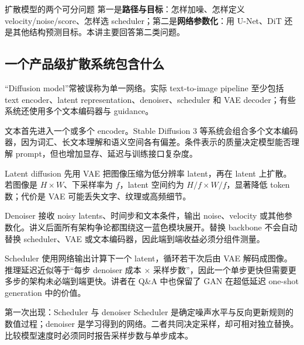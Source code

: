 \begin{importantbox}{扩散模型的两个可分问题}
第一是\textbf{路径与目标}：怎样加噪、怎样定义 velocity/noise/score、怎样选 scheduler；第二是\textbf{网络参数化}：用 U-Net、DiT 还是其他结构预测目标。本讲主要回答第二类问题。
\end{importantbox}

\subsection{一个产品级扩散系统包含什么}

“Diffusion model”常被误称为单一网络。实际 text-to-image pipeline 至少包括 text encoder、latent representation、denoiser、scheduler 和 VAE decoder；有些系统还使用多个文本编码器与 guidance。


文本首先进入一个或多个 encoder。Stable Diffusion 3 等系统会组合多个文本编码器，因为词汇、长文本理解和语义空间各有偏差。条件表示的质量决定模型能否理解 prompt，但也增加显存、延迟与训练接口复杂度。


Latent diffusion 先用 VAE 把图像压缩为低分辨率 latent，再在 latent 上扩散。若图像是 $H\times W$、下采样率为 $f$，latent 空间约为 $H/f\times W/f$，显著降低 token 数；代价是 VAE 可能丢失文字、纹理或高频细节。


Denoiser 接收 noisy latents、时间步和文本条件，输出 noise、velocity 或其他参数化。讲义后面所有架构争论都围绕这一蓝色模块展开。替换 backbone 不会自动替换 scheduler、VAE 或文本编码器，因此端到端收益必须分组件测量。


Scheduler 使用网络输出计算下一个 latent，循环若干次后由 VAE 解码成图像。推理延迟近似等于“每步 denoiser 成本 × 采样步数”，因此一个单步更快但需要更多步的架构未必端到端更快。讲者在 Q\&A 中也保留了 GAN 在超低延迟 one-shot generation 中的价值。

\begin{knowledgebox}{第一次出现：Scheduler 与 denoiser}
Scheduler 是确定噪声水平与反向更新规则的数值过程；denoiser 是学习得到的网络。二者共同决定采样，却可相对独立替换。比较模型速度时必须同时报告采样步数与单步成本。
\end{knowledgebox}

